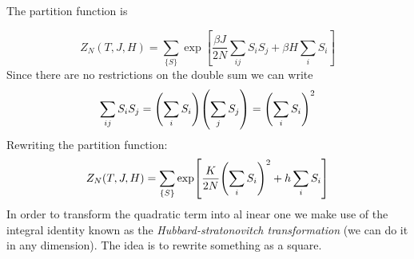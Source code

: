 \documentclass[../main/main.tex]{subfiles}
\begin{document}

The partition function is

\begin{equation}
Z_N (T,J,H) = \sum_{\{ S \}  }^{} \exp [\frac{\beta J}{2N} \sum_{ij}^{} S_i S_j + \beta H \sum_{i}^{} S_i    ]
\end{equation}
Since there are no restrictions on the double sum we can write
\begin{equation}
  \sum_{ij}^{} S_i S_j  = \qty(\sum_{i}^{} S_i ) \qty(\sum_{j}^{} S_j )= \qty( \sum_{i}^{} S_i )^2
\end{equation}
Rewriting the partition function:
\begin{equation}
  Z_N (T,J,H)  =   \sum_{\{ S \}  }^{} \exp  [\frac{K}{2N} \qty( \sum_{i}^{} S_i )^2 + h \sum_{i}^{} S_i    ]
\end{equation}
In order to transform the quadratic term into al inear one we make use of the integral identity known as the \emph{Hubbard-stratonovitch transformation} (we can do it in any dimension). The idea is to rewrite something as a square.
\end{document}
